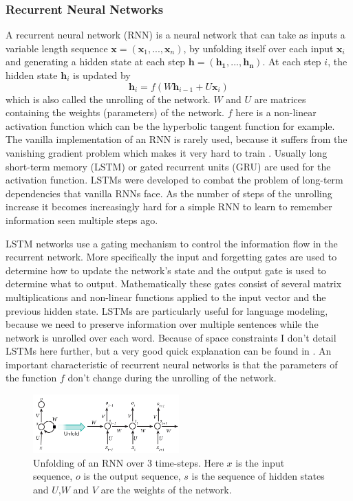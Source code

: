 \documentclass[12pt]{article}
\begin{document}
\subsubsection{Recurrent Neural Networks} \label{sssec:231}
A recurrent neural network (RNN) \cite{RNN:1988} is a neural network that can take as inputs a variable length sequence \(\bm{x}=(\bm{x}_1,...,\bm{x}_n)\), by unfolding itself over each input \(\bm{x}_i\) and generating a hidden state at each step \(\bm{h}=(\bm{h_1},...,\bm{h_n})\). At each step \(i\), the hidden state \(\bm{h}_i\) is updated by
\begin{equation} \label{eq231a}
\bm{h}_i=f(W\bm{h}_{i-1}+U\bm{x}_i)
\end{equation}
which is also called the unrolling of the network. \(W\) and \(U\) are matrices containing the weights (parameters) of the network. \(f\) here is a non-linear activation function which can be the hyperbolic tangent function for example. The vanilla implementation of an RNN is rarely used, because it suffers from the vanishing gradient problem which makes it very hard to train \cite{Hochreiter:1998}. Usually long short-term memory (LSTM) \cite{Hochreiter:1997} or gated recurrent units (GRU) \cite{Cho:2014} are used for the activation function. LSTMs were developed to combat the problem of long-term dependencies that vanilla RNNs face. As the number of steps of the unrolling increase it becomes increasingly hard for a simple RNN to learn to remember information seen multiple steps ago. 

LSTM networks use a gating mechanism to control the information flow in the recurrent network. More specifically the input and forgetting gates are used to determine how to update the network's state and the output gate is used to determine what to output. Mathematically these gates consist of several matrix multiplications and non-linear functions applied to the input vector and the previous hidden state. LSTMs are particularly useful for language modeling, because we need to preserve information over multiple sentences while the network is unrolled over each word. Because of space constraints I don't detail LSTMs here further, but a very good quick explanation can be found in \cite{LSTM_article}. An important characteristic of recurrent neural networks is that the parameters of the function \(f\) don't change during the unrolling of the network.

\begin{figure}[H]
	\label{fig:231}
	\centering
	\includegraphics[width=0.5\textwidth]{pics/rnn.jpg}
	\caption{Unfolding of an RNN over 3 time-steps. Here \(x\) is the input sequence, \(o\) is the output sequence, \(s\) is the sequence of hidden states and \(U\),\(W\) and \(V\) are the weights of the network. \cite{RNN_pic:2017}}
\end{figure}
\end{document}
